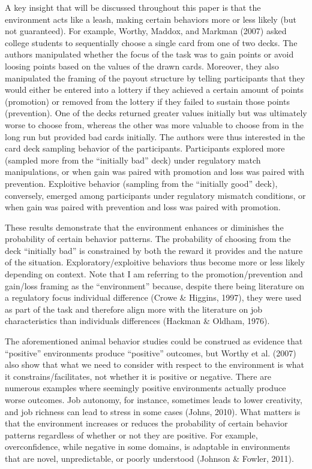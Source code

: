 \documentclass[english,,man]{apa6}
\theoremstyle{definition}
\theoremstyle{definition}
\theoremstyle{definition}
\theoremstyle{remark}
\begin{document}
A key insight that will be discussed throughout this paper is that the
environment acts like a leash, making certain behaviors more or less
likely (but not guaranteed). For example, Worthy, Maddox, and Markman
(2007) asked college students to sequentially choose a single card from
one of two decks. The authors manipulated whether the focus of the task
was to gain points or avoid loosing points based on the values of the
drawn cards. Moreover, they also manipulated the framing of the payout
structure by telling participants that they would either be entered into
a lottery if they achieved a certain amount of points (promotion) or
removed from the lottery if they failed to sustain those points
(prevention). One of the decks returned greater values initially but was
ultimately worse to choose from, whereas the other was more valuable to
choose from in the long run but provided bad cards initially. The
authors were thus interested in the card deck sampling behavior of the
participants. Participants explored more (sampled more from the
\enquote{initially bad} deck) under regulatory match manipulations, or
when gain was paired with promotion and loss was paired with prevention.
Exploitive behavior (sampling from the \enquote{initially good} deck),
conversely, emerged among participants under regulatory mismatch
conditions, or when gain was paired with prevention and loss was paired
with promotion.

These results demonstrate that the environment enhances or diminishes
the probability of certain behavior patterns. The probability of
choosing from the deck \enquote{initially bad} is constrained by both
the reward it provides and the nature of the situation.
Exploratory/exploitive behaviors thus become more or less likely
depending on context. Note that I am referring to the
promotion/prevention and gain/loss framing as the \enquote{environment}
because, despite there being literature on a regulatory focus individual
difference (Crowe \& Higgins, 1997), they were used as part of the task
and therefore align more with the literature on job characteristics than
individuals differences (Hackman \& Oldham, 1976).

The aforementioned animal behavior studies could be construed as
evidence that \enquote{positive} environments produce \enquote{positive}
outcomes, but Worthy et al. (2007) also show that what we need to
consider with respect to the environment is what it
constrains/facilitates, not whether it is positive or negative. There
are numerous examples where seemingly positive environments actually
produce worse outcomes. Job autonomy, for instance, sometimes leads to
lower creativity, and job richness can lead to stress in some cases
(Johns, 2010). What matters is that the environment increases or reduces
the probability of certain behavior patterns regardless of whether or
not they are positive. For example, overconfidence, while negative in
some domains, is adaptable in environments that are novel,
unpredictable, or poorly understood (Johnson \& Fowler, 2011).
\end{document}

